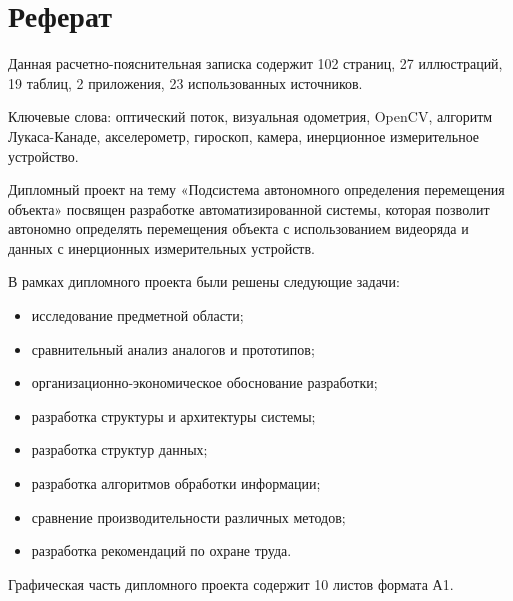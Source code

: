 \newpage
\section*{Реферат}


Данная расчетно-пояснительная записка содержит 102 страниц, 27 иллюстраций, 19 таблиц, 2 приложения, 23 использованных источников.

Ключевые слова: оптический поток, визуальная одометрия, OpenCV, алгоритм Лукаса-Канаде, акселерометр, гироскоп, камера, инерционное измерительное устройство. 

Дипломный проект на тему «Подсистема автономного определения перемещения объекта» посвящен разработке автоматизированной системы, которая позволит автономно определять перемещения объекта с использованием видеоряда и данных с инерционных измерительных устройств.

В рамках дипломного проекта были решены следующие задачи:
\begin{itemize}
\item исследование предметной области;
\item сравнительный анализ аналогов и прототипов;
\item организационно-экономическое обоснование разработки;
\item разработка структуры и архитектуры системы;
\item разработка структур данных;
\item разработка алгоритмов обработки информации;
\item сравнение производительности различных методов;
\item разработка рекомендаций по охране труда.
\end{itemize}

Графическая часть дипломного проекта содержит 10 листов формата А1.



